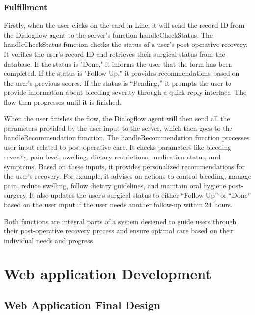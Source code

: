 \documentclass[12pt,oneside,openright,a4paper]{cpe-english-project}
\begin{document}
        \subsubsection{Fulfillment}
          \qquad Firstly, when the user clicks on the card in Line, it will send the record ID from the Dialogflow agent to the server’s function handleCheckStatus. The handleCheckStatus function checks the status of a user's post-operative recovery. It verifies the user's record ID and retrieves their surgical status from the database. If the status is "Done," it informs the user that the form has been completed. If the status is "Follow Up," it provides recommendations based on the user's previous scores. If the status is “Pending,” it prompts the user to provide information about bleeding severity through a quick reply interface. The flow then progresses until it is finished. \par
          \qquad When the user finishes the flow, the Dialogflow agent will then send all the parameters provided by the user input to the server, which then goes to the handleRecommendation function. The handleRecommendation function processes user input related to post-operative care. It checks parameters like bleeding severity, pain level, swelling, dietary restrictions, medication status, and symptoms. Based on these inputs, it provides personalized recommendations for the user's recovery. For example, it advises on actions to control bleeding, manage pain, reduce swelling, follow dietary guidelines, and maintain oral hygiene post-surgery. It also updates the user's surgical status to either “Follow Up” or “Done” based on the user input if the user needs another follow-up within 24 hours.\par
          \qquad Both functions are integral parts of a system designed to guide users through their post-operative recovery process and ensure optimal care based on their individual needs and progress. \par
    \newpage
    \section{Web application Development}
      \subsection{Web Application Final Design}
\end{document}
